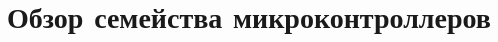 



\mytitle{\ }
\maketitle
\tableofcontents
\listoflab

\part{Обзор семейства микроконтроллеров \cx}



\part{\cmsis}


